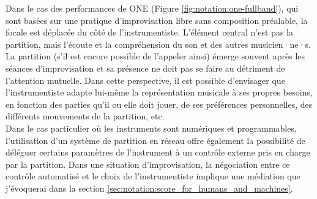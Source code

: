 \noindent Dans le cas des performances de ONE (Figure \ref{fig:notation:one-fullband}), qui sont basées sur une pratique d'improvisation libre sans composition préalable, la focale est déplacée du côté de l'instrumentiste. L'élément central n'est pas la partition, mais l'écoute et la compréhension du son et des autres musicien·ne·s. La partition (s'il est encore possible de l'appeler ainsi) émerge souvent après les séances d'improvisation et sa présence ne doit pas se faire au détriment de l'attention mutuelle. Dans cette perspective, il est possible d'envisager que l'instrumentiste adapte lui-même la représentation musicale à ses propres besoins, en fonction des parties qu'il ou elle doit jouer, de ses préférences personnelles, des différents mouvements de la partition, etc.\\
\indent Dans le cas particulier où les instruments sont numériques et programmables, l'utilisation d'un système de partition en réseau offre également la possibilité de déléguer certains paramètres de l'instrument à un contrôle externe pris en charge par la partition. Dans une situation d'improvisation, la négociation entre ce contrôle automatisé et le choix de l'instrumentiste implique une médiation que j'évoquerai dans la section \ref{sec:notation:score_for_humans_and_machines}.

